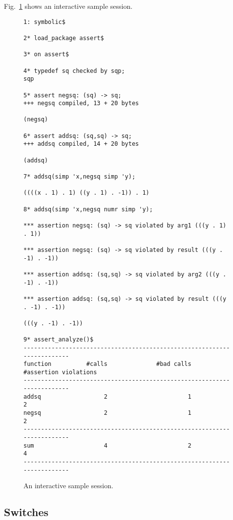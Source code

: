 Fig.~\ref{FIG:sample} shows an interactive sample session.
%
\begin{figure}
  \begin{small}
\begin{verbatim}
1: symbolic$

2* load_package assert$

3* on assert$

4* typedef sq checked by sqp;
sqp

5* assert negsq: (sq) -> sq;
+++ negsq compiled, 13 + 20 bytes

(negsq)

6* assert addsq: (sq,sq) -> sq;
+++ addsq compiled, 14 + 20 bytes

(addsq)

7* addsq(simp 'x,negsq simp 'y);

((((x . 1) . 1) ((y . 1) . -1)) . 1)

8* addsq(simp 'x,negsq numr simp 'y);

*** assertion negsq: (sq) -> sq violated by arg1 (((y . 1) . 1))

*** assertion negsq: (sq) -> sq violated by result (((y . -1) . -1))

*** assertion addsq: (sq,sq) -> sq violated by arg2 (((y . -1) . -1))

*** assertion addsq: (sq,sq) -> sq violated by result (((y . -1) . -1))

(((y . -1) . -1))

9* assert_analyze()$
------------------------------------------------------------------------
function          #calls              #bad calls   #assertion violations
------------------------------------------------------------------------
addsq                  2                       1                       2
negsq                  2                       1                       2
------------------------------------------------------------------------
sum                    4                       2                       4
------------------------------------------------------------------------
\end{verbatim}
  \end{small}
  \caption{An interactive sample session.}\label{FIG:sample}
\end{figure}

\subsection{Switches}
\hypertarget{switch:ASSERT}{}
\hypertarget{switch:ASSERTBREAK}{}
\hypertarget{switch:ASSERTSTATISTICS}{}

